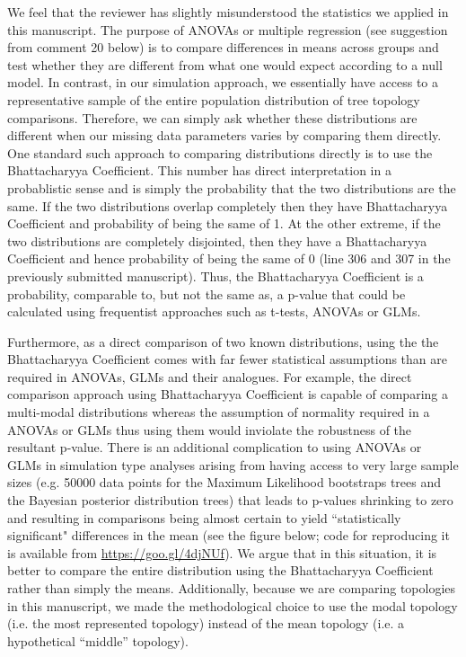\documentclass[11pt]{letter}
\begin{document}
\begin{letter}{}
We feel that the reviewer has slightly misunderstood the statistics we applied in this manuscript. The purpose of ANOVAs or multiple regression (see suggestion from comment 20 below) is to compare differences in means across groups and test whether they are different from what one would expect according to a null model. In contrast, in our simulation approach, we essentially have access to a representative sample of the entire population distribution of tree topology comparisons. Therefore, we can simply ask whether these distributions are different when our missing data parameters varies by comparing them directly. One standard such approach to comparing distributions directly is to use the Bhattacharyya Coefficient. This number has direct interpretation in a probablistic sense and is simply the probability that the two distributions are the same. If the two distributions overlap completely then they have Bhattacharyya Coefficient and probability of being the same of 1. At the other extreme, if the two distributions are completely disjointed, then they have a Bhattacharyya Coefficient and hence probability of being the same of 0 (line 306 and 307 in the previously submitted manuscript). Thus, the Bhattacharyya Coefficient is a probability, comparable to, but not the same as, a p-value that could be calculated using frequentist approaches such as t-tests, ANOVAs or GLMs.

Furthermore, as a direct comparison of two known distributions, using the the Bhattacharyya Coefficient comes with far fewer statistical assumptions than are required in ANOVAs, GLMs and their analogues. For example, the direct comparison approach using Bhattacharyya Coefficient is capable of comparing a multi-modal distributions whereas the assumption of normality required in a ANOVAs or GLMs thus using them would inviolate the robustness of the resultant p-value. There is an additional complication to using ANOVAs or GLMs in simulation type analyses arising from having access to very large sample sizes (e.g. 50000 data points for the Maximum Likelihood bootstraps trees and the Bayesian posterior distribution trees) that leads to p-values shrinking to zero and resulting in comparisons being almost certain to yield ``statistically significant" differences in the mean (see the figure below; code for reproducing it is available from \href{https://github.com/TGuillerme/Total_Evidence_Method-Missing_data/blob/master/Analysis/Comparing_distribution_example.R}{https://goo.gl/4djNUf}). We argue that in this situation, it is better to compare the entire distribution using the Bhattacharyya Coefficient rather than simply the means. Additionally, because we are comparing topologies in this manuscript, we made the methodological choice to use the modal topology (i.e. the most represented topology) instead of the mean topology (i.e. a hypothetical ``middle'' topology).


\end{letter}
\end{document}
